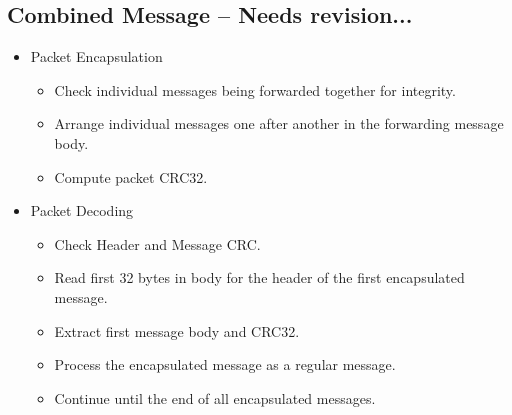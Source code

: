 \begin{landscape}

\subsection{Combined Message -- Needs revision...}
\begin{framed}
\begin{itemize}
\item Packet Encapsulation
\begin{itemize}

\item Check individual messages being forwarded together for integrity.
\item Arrange individual messages one after another in the forwarding message body.
\item Compute packet CRC32.

\end{itemize}

\item Packet Decoding
\begin{itemize}
\item Check Header and Message CRC.
\item Read first 32 bytes in body for the header of the first encapsulated message.
\item Extract first message body and CRC32.
\item Process the encapsulated message as a regular message.
\item Continue until the end of all encapsulated messages.
\end{itemize}
\end{itemize}
\end{framed}


\end{landscape}

